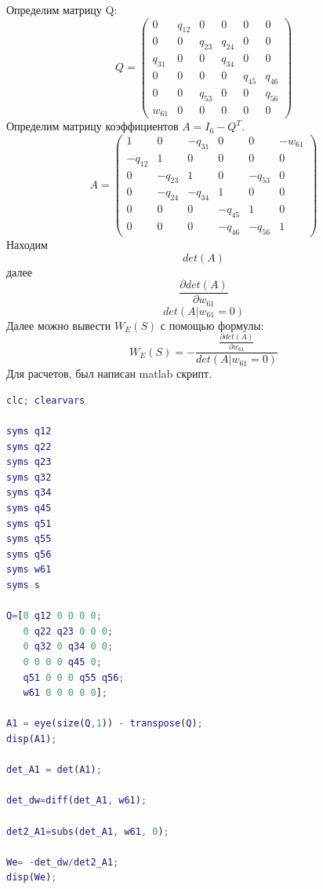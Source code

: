 \documentclass[14pt,a4paper,report]{report}
\begin{document}
Определим матрицу Q:
\begin{equation*}
Q = 
 \begin{pmatrix}
  0 & q_{12} & 0 & 0 & 0 & 0 \\
  0 & 0 & q_{23} & q_{24} & 0 & 0 \\ 
  q_{31} & 0 & 0 & q_{34} & 0 & 0 \\ 
  0 & 0 & 0 & 0 & q_{45} & q_{46} \\ 
  0 & 0 & q_{53} & 0 & 0 & q_{56} \\ 
  w_{61} & 0 & 0 & 0 & 0 & 0 
 \end{pmatrix}
\end{equation*}
Определим матрицу коэффициентов $A=I_6-Q^T$.
\begin{equation*}
A = 
 \begin{pmatrix}
    1&       0&    -q_{31}&    0&    0& -w_{61}\\
 -q_{12}& 1 & 0&    0&       0&    0\\
    0&    -q_{23}&    1&    0&       -q_{53}&    0\\
    0&       -q_{24}& -q_{34}&    1&       0&    0\\
    0&       0&    0& -q_{45}& 1 &    0\\
    0&       0&    0&    -q_{46}&    -q_{56}&    1
 \end{pmatrix}
\end{equation*}
Находим 
\begin{equation*}
det(A)
\end{equation*}
далее
\begin{equation*}
\frac{\partial det(A)}{\partial w_{61}}
\end{equation*}
\begin{equation*}
det(A | w_{61}=0)
\end{equation*}
Далее можно вывести $W_E(S)$ с помощью формулы:
\begin{equation*}
W_E(S)=-\frac{\frac{\partial det(A)}{\partial w_{61}}}{det(A | w_{61}=0)}
\end{equation*}
Для расчетов, был написан matlab скрипт.
\begin{lstlisting}[language={matlab}, caption={Matlab скрипт}, basicstyle=\ttfamily]
clc; clearvars

syms q12
syms q22
syms q23
syms q32
syms q34
syms q45
syms q51
syms q55
syms q56
syms w61
syms s

Q=[0 q12 0 0 0 0;
   0 q22 q23 0 0 0;
   0 q32 0 q34 0 0;
   0 0 0 0 q45 0;
   q51 0 0 0 q55 q56;
   w61 0 0 0 0 0];

A1 = eye(size(Q,1)) - transpose(Q);
disp(A1);

det_A1 = det(A1);

det_dw=diff(det_A1, w61);

det2_A1=subs(det_A1, w61, 0);

We= -det_dw/det2_A1;
disp(We);
\end{lstlisting}
\end{document}

